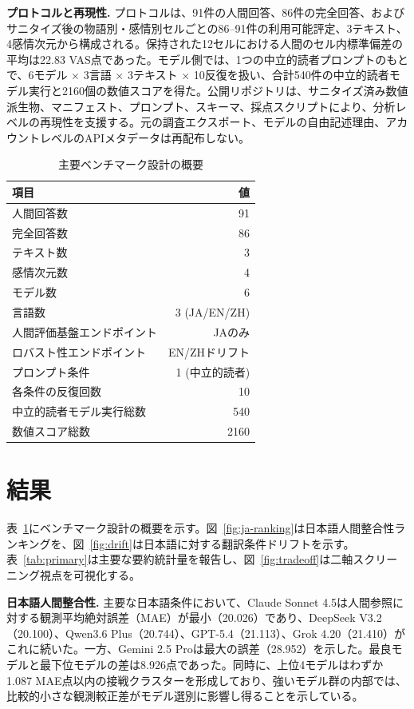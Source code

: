 \documentclass[lualatex,ja=standard,a4paper,11pt]{bxjsarticle}
\begin{document}
\textbf{プロトコルと再現性.}
プロトコルは、91件の人間回答、86件の完全回答、およびサニタイズ後の物語別・感情別セルごとの86--91件の利用可能評定、3テキスト、4感情次元から構成される。保持された12セルにおける人間のセル内標準偏差の平均は22.83 VAS点であった。モデル側では、1つの中立的読者プロンプトのもとで、6モデル $\times$ 3言語 $\times$ 3テキスト $\times$ 10反復を扱い、合計540件の中立的読者モデル実行と2160個の数値スコアを得た。公開リポジトリは、サニタイズ済み数値派生物、マニフェスト、プロンプト、スキーマ、採点スクリプトにより、分析レベルの再現性を支援する。元の調査エクスポート、モデルの自由記述理由、アカウントレベルのAPIメタデータは再配布しない。

\begin{table}[t]
\caption{主要ベンチマーク設計の概要}
\label{tab:design}
\centering
\begin{tabular}{lr}
\toprule
項目 & 値 \\
\midrule
人間回答数 & 91 \\
完全回答数 & 86 \\
テキスト数 & 3 \\
感情次元数 & 4 \\
モデル数 & 6 \\
言語数 & 3 (JA/EN/ZH) \\
人間評価基盤エンドポイント & JAのみ \\
ロバスト性エンドポイント & EN/ZHドリフト \\
プロンプト条件 & 1 (中立的読者) \\
各条件の反復回数 & 10 \\
中立的読者モデル実行総数 & 540 \\
数値スコア総数 & 2160 \\
\bottomrule
\end{tabular}
\end{table}

\section{結果}

表~\ref{tab:design}にベンチマーク設計の概要を示す。図~\ref{fig:ja-ranking}は日本語人間整合性ランキングを、図~\ref{fig:drift}は日本語に対する翻訳条件ドリフトを示す。表~\ref{tab:primary}は主要な要約統計量を報告し、図~\ref{fig:tradeoff}は二軸スクリーニング視点を可視化する。

\textbf{日本語人間整合性.}
主要な日本語条件において、Claude Sonnet 4.5は人間参照に対する観測平均絶対誤差（MAE）が最小（20.026）であり、DeepSeek V3.2（20.100）、Qwen3.6 Plus（20.744）、GPT-5.4（21.113）、Grok 4.20（21.410）がこれに続いた。一方、Gemini 2.5 Proは最大の誤差（28.952）を示した。最良モデルと最下位モデルの差は8.926点であった。同時に、上位4モデルはわずか1.087 MAE点以内の接戦クラスターを形成しており、強いモデル群の内部では、比較的小さな観測較正差がモデル選別に影響し得ることを示している。
\end{document}
